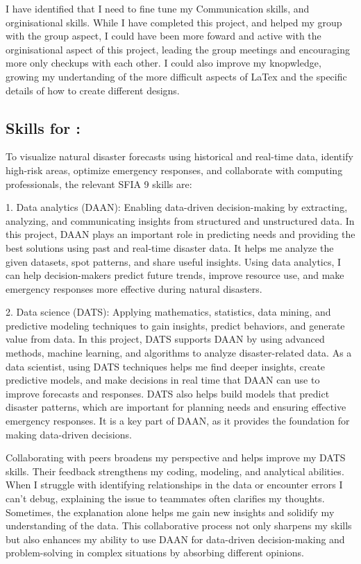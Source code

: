 \documentclass[a4paper, 11pt]{report}
\begin{document}
I have identified that I need to fine tune my Communication skills, and orginisational skills. While I have completed this project, and helped my group with the group aspect, I could have been more foward and active with the orginisational aspect of this project, leading the group meetings and encouraging more only checkups with each other. I could also improve my knopwledge, growing my undertanding of the more difficult aspects of LaTex and the specific details of how to create different designs. 



\subsection{Skills for \majB: \studB}

To visualize natural disaster forecasts using historical and real-time data, identify high-risk areas, optimize emergency responses, and collaborate with computing professionals, the relevant SFIA 9 skills are:

1. Data analytics (DAAN): Enabling data-driven decision-making by extracting, analyzing, and communicating insights from structured and unstructured data. In this project, DAAN plays an important role in predicting needs and providing the best solutions using past and real-time disaster data. It helps me analyze the given datasets, spot patterns, and share useful insights. Using data analytics, I can help decision-makers predict future trends, improve resource use, and make emergency responses more effective during natural disasters.


2. Data science (DATS): Applying mathematics, statistics, data mining, and predictive modeling techniques to gain insights, predict behaviors, and generate value from data. In this project, DATS supports DAAN by using advanced methods, machine learning, and algorithms to analyze disaster-related data. As a data scientist, using DATS techniques helps me find deeper insights, create predictive models, and make decisions in real time that DAAN can use to improve forecasts and responses. DATS also helps build models that predict disaster patterns, which are important for planning needs and ensuring effective emergency responses. It is a key part of DAAN, as it provides the foundation for making data-driven decisions.

Collaborating with peers broadens my perspective and helps improve my DATS skills. Their feedback strengthens my coding, modeling, and analytical abilities. When I struggle with identifying relationships in the data or encounter errors I can't debug, explaining the issue to teammates often clarifies my thoughts. Sometimes, the explanation alone helps me gain new insights and solidify my understanding of the data. This collaborative process not only sharpens my skills but also enhances my ability to use DAAN for data-driven decision-making and problem-solving in complex situations by absorbing different opinions.
\end{document}
